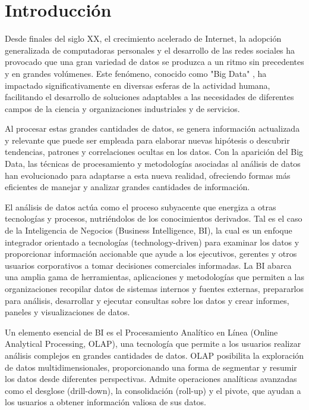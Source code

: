 \chapter*{Introducción}\label{chapter:introduction}

Desde finales del siglo XX, el crecimiento acelerado de Internet, la adopci\'on generalizada de computadoras 
personales y el desarrollo de las redes sociales ha provocado que una gran variedad de datos se produzca a un ritmo 
sin precedentes y en grandes vol\'umenes. 
Este fen\'omeno, conocido como "Big Data" \cite{beyer2012importance}, ha impactado significativamente en diversas 
esferas de la actividad humana, facilitando el desarrollo de soluciones adaptables a las necesidades de diferentes 
campos de la ciencia y organizaciones industriales y de servicios.

Al procesar estas grandes cantidades de datos, se genera información actualizada y relevante que puede ser empleada 
para elaborar nuevas hipótesis o descubrir tendencias, patrones y correlaciones ocultas en los datos. Con la aparición del 
Big Data, las técnicas de procesamiento y metodologías asociadas al análisis de datos han evolucionado para adaptarse a esta 
nueva realidad, ofreciendo formas más eficientes de manejar y analizar grandes cantidades de información.

El an\'alisis de datos act\'ua como el proceso subyacente que energiza a otras tecnolog\'ias y procesos, nutri\'endolos
de los conocimientos derivados. Tal es el 
caso de la Inteligencia de Negocios (Business Intelligence, BI), la cual es un enfoque integrador orientado a tecnolog\'ias (technology-driven) 
para examinar los datos y proporcionar información accionable que ayude a los ejecutivos, gerentes y otros usuarios corporativos 
a tomar decisiones comerciales informadas. La BI abarca una amplia gama de herramientas, aplicaciones y metodologías 
que permiten a las organizaciones recopilar datos de sistemas internos y fuentes externas, prepararlos para análisis, 
desarrollar y ejecutar consultas sobre los datos y crear informes, paneles y visualizaciones de datos\cite{negash2004business}. 

Un elemento esencial de BI es el Procesamiento Analítico en Línea (Online Analytical Processing, OLAP), una tecnología que 
permite a los usuarios realizar análisis complejos en grandes cantidades de datos. OLAP posibilita la exploración de datos 
multidimensionales, proporcionando una forma de segmentar y resumir los datos desde diferentes perspectivas. Admite 
operaciones analíticas avanzadas como el desglose (drill-down), la consolidación (roll-up) y el pivote, que ayudan a los 
usuarios a obtener información valiosa de sus datos.

